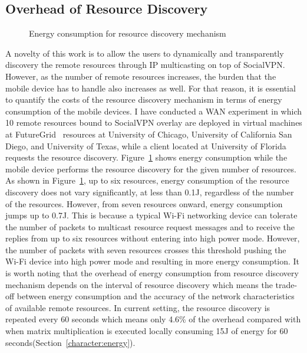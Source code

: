 \subsection{Overhead of Resource Discovery}
\label{offloading:overhead_discovery}
%
\begin{figure}
\centering
{}
\caption{Energy consumption for resource discovery mechanism}
\label{fig:energy_discovery}
\end{figure}
%
A novelty of this work is to allow the users to dynamically and
transparently discovery the remote resources through IP multicasting on
top of SocialVPN.
%
However, as the number of remote resources increases, the burden that
the mobile device has to handle also increases as well.
%
For that reason, it is essential to quantify the costs of the resource
discovery mechanism in terms of energy consumption of the mobile
devices.
%
I have conducted a WAN experiment in which 10 remote resources bound to
SocialVPN overlay are deployed in virtual machines at
FutureGrid~\cite{futuregrid} resources at University of Chicago,
University of California San Diego, and University of Texas, while a
client located at University of Florida requests the resource discovery.
%
Figure~\ref{fig:energy_discovery} shows energy consumption while the mobile
device performs the resource discovery for the given number of
resources.
%
As shown in Figure~\ref{fig:energy_discovery}, up to six resources,
energy consumption of the resource discovery does not vary
significantly, at less than 0.1J, regardless of the number of the
resources.
%
However, from seven resources onward, energy consumption jumps up to
0.7J.
%
This is because a typical Wi-Fi networking device can tolerate the
number of packets to multicast resource request messages and to receive
the replies from up to six resources without entering into high power
mode.
%
However, the number of packets with seven resources crosses this
threshold pushing the Wi-Fi device into high power mode and resulting in
more energy consumption.
%
It is worth noting that the overhead of energy consumption from resource
discovery mechanism depends on the interval of resource discovery which
means the trade-off between energy consumption and the accuracy of the
network characteristics of available remote resources.
%
In current setting, the resource discovery is repeated every 60 seconds
which means only 4.6\% of the overhead compared with when matrix
multiplication is executed locally consuming 15J of energy for 60
seconds(Section~\ref{character:energy}).
%
